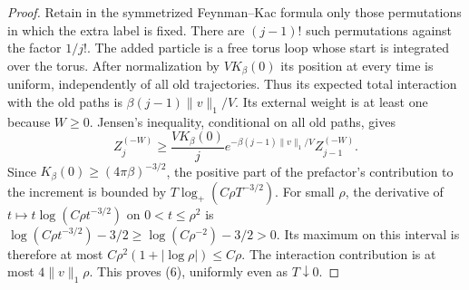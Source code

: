 \begin{proof}
Retain in the symmetrized Feynman--Kac
formula only those permutations in which the extra label is fixed.
There are $(j-1)!$ such permutations against the factor $1/j!$.
The added particle is a free torus loop whose start is integrated
over the torus. After normalization by $VK_\beta(0)$ its position
at every time is uniform, independently of all old trajectories.
Thus its expected total interaction with the old paths is
$\beta(j-1)\|v\|_1/V$. Its external weight is at least one because
$W\geq0$. Jensen's inequality, conditional on all old paths, gives
\[
 Z_j^{(-W)}\geq\frac{VK_\beta(0)}j
 e^{-\beta(j-1)\|v\|_1/V}Z_{j-1}^{(-W)}.
\]
Since $K_\beta(0)\geq(4\pi\beta)^{-3/2}$, the positive part of the
prefactor's contribution to the increment is bounded by
$T\log_+(C\rho T^{-3/2})$. For small $\rho$, the derivative of
$t\mapsto t\log(C\rho t^{-3/2})$ on $0<t\leq\rho^2$ is
$\log(C\rho t^{-3/2})-3/2\geq\log(C\rho^{-2})-3/2>0$.
Its maximum on this interval is therefore at most
$C\rho^2(1+|\log\rho|)\leq C\rho$.
The interaction contribution is at most $4\|v\|_1\rho$.
This proves (6), uniformly even as $T\downarrow0$.
\end{proof}

